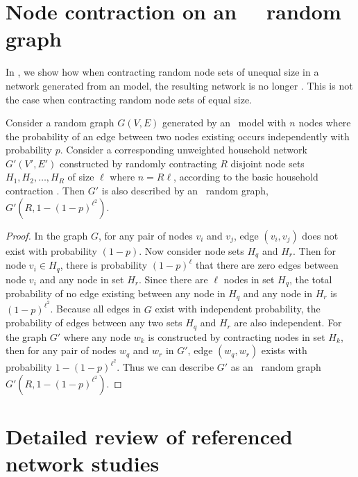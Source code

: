 \section{Node contraction on an ~\ER~random graph}\label{apx:ER}
In , we show how when contracting random node sets of unequal size in a network generated from an \ER model, the resulting network is no longer \ER. This is not the case when contracting random node sets of equal size. 

\begin{proposition}
    Consider a random graph $G(V,E)$ generated by an \ER~model with $n$ nodes where the probability of an edge between two nodes existing occurs independently with probability $p$. Consider a corresponding unweighted household network $G'(V', E')$ constructed by randomly contracting $R$ disjoint node sets $H_1, H_2, \ldots, H_R$ of size $\ell$ where $n = R\ell$, according to the basic household contraction . Then $G'$ is also described by an \ER~random graph, $G'(R, 1 - (1-p)^{\ell^2})$.
\end{proposition}

\begin{proof}
    In the graph $G$, for any pair of nodes $v_i$ and $v_j$, edge $(v_i, v_j)$ does not exist with probability $(1-p)$. Now consider node sets $H_q$ and $H_r$. Then for node $v_i \in H_q$, there is probability $(1-p)^\ell$ that there are zero edges between node $v_i$ and any node in set $H_r$. Since there are $\ell$ nodes in set $H_q$, the total probability of no edge existing between any node in $H_q$ and any node in $H_r$ is $(1-p)^{\ell^2}$. 
    Because all edges in $G$ exist with independent probability, the probability of edges between any two sets $H_q$ and $H_r$ are also independent. For the graph $G'$ where any node $w_k$ is constructed by contracting nodes in set $H_k$, then for any pair of nodes $w_q$ and $w_r$ in $G'$, edge $(w_q, w_r)$ exists with probability $1 - (1-p)^{\ell^2}.$ Thus we can describe $G'$ as an \ER~random graph $G'(R, 1 - (1-p)^{\ell^2}).$ 
\end{proof}


\section{Detailed review of referenced network studies}\label{apx:emp_rev}


